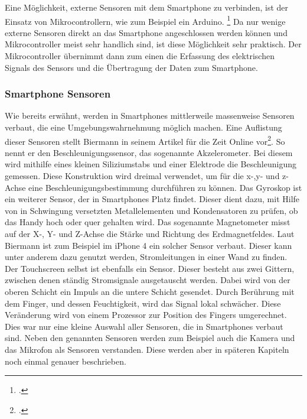 Eine Möglichkeit, externe Sensoren mit dem Smartphone zu verbinden, ist der Einsatz von Mikrocontrollern, wie zum Beispiel ein Arduino. \footcite[Arduino UNO R3 Mikrocontroller: ][]{Ard18} Da nur wenige externe Sensoren direkt an das Smartphone angeschlossen werden können und Mikrocontroller meist sehr handlich sind, ist diese Möglichkeit sehr praktisch. Der Mikrocontroller übernimmt dann zum einen die Erfassung des elektrischen Signals des Sensors und die Übertragung der Daten zum Smartphone. 
\subsubsection{Smartphone Sensoren}
Wie bereits erwähnt, werden in Smartphones mittlerweile massenweise Sensoren verbaut, die eine Umgebungswahrnehmung möglich machen. Eine Auflistung dieser Sensoren stellt Biermann in seinem Artikel für die Zeit Online vor\footcite[siehe ][]{Bie14}.\newline
So nennt er den Beschleunigungssensor, das sogenannte Akzelerometer. Bei diesem wird mithilfe eines kleinen Siliziumstabs und einer Elektrode die Beschleunigung gemessen. Diese Konstruktion wird dreimal verwendet, um für die x-,y- und z-Achse eine Beschleunigungsbestimmung durchführen zu können.\newline
Das Gyroskop ist ein weiterer Sensor, der in Smartphones Platz findet. Dieser dient dazu, mit Hilfe von in Schwingung versetzten Metallelementen und Kondensatoren zu prüfen, ob das Handy hoch oder quer gehalten wird.\newline
Das sogenannte Magnetometer misst auf der X-, Y- und Z-Achse die Stärke und Richtung des Erdmagnetfeldes. Laut Biermann ist zum Beispiel im iPhone 4 ein solcher Sensor verbaut. Dieser kann unter anderem dazu genutzt werden, Stromleitungen in einer Wand zu finden.\newline
Der Touchscreen selbst ist ebenfalls ein Sensor. Dieser besteht aus zwei Gittern, zwischen denen ständig Stromsignale ausgetauscht werden. Dabei wird von der oberen Schicht ein Impuls an die untere Schicht gesendet. Durch Berührung mit dem Finger, und dessen Feuchtigkeit, wird das Signal lokal schwächer. Diese Veränderung wird von einem Prozessor zur Position des Fingers umgerechnet.\newline
Dies war nur eine kleine Auswahl aller Sensoren, die in Smartphones verbaut sind. Neben den genannten Sensoren werden zum Beispiel auch die Kamera und das Mikrofon als Sensoren verstanden. Diese werden aber in späteren Kapiteln noch einmal genauer beschrieben.
